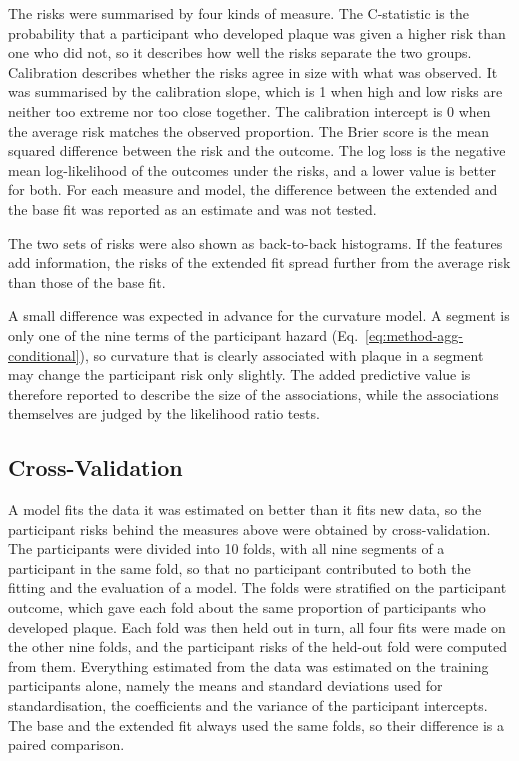 The risks were summarised by four kinds of measure.
The C-statistic is the probability that a participant who developed plaque was given a higher risk than one who did not, so it describes how well the risks separate the two groups.
Calibration describes whether the risks agree in size with what was observed.
It was summarised by the calibration slope, which is 1 when high and low risks are neither too extreme nor too close together.
The calibration intercept is 0 when the average risk matches the observed proportion.
The Brier score is the mean squared difference between the risk and the outcome.
The log loss is the negative mean log-likelihood of the outcomes under the risks, and a lower value is better for both.
For each measure and model, the difference between the extended and the base fit was reported as an estimate and was not tested.

The two sets of risks were also shown as back-to-back histograms.
If the features add information, the risks of the extended fit spread further from the average risk than those of the base fit.

A small difference was expected in advance for the curvature model.
A segment is only one of the nine terms of the participant hazard (Eq.~\eqref{eq:method-agg-conditional}), so curvature that is clearly associated with plaque in a segment may change the participant risk only slightly.
The added predictive value is therefore reported to describe the size of the associations, while the associations themselves are judged by the likelihood ratio tests.

\subsection{Cross-Validation}
\label{sec:method-cv}

A model fits the data it was estimated on better than it fits new data, so the participant risks behind the measures above were obtained by cross-validation.
The participants were divided into 10 folds, with all nine segments of a participant in the same fold, so that no participant contributed to both the fitting and the evaluation of a model.
The folds were stratified on the participant outcome, which gave each fold about the same proportion of participants who developed plaque.
Each fold was then held out in turn, all four fits were made on the other nine folds, and the participant risks of the held-out fold were computed from them.
Everything estimated from the data was estimated on the training participants alone, namely the means and standard deviations used for standardisation, the coefficients and the variance of the participant intercepts.
The base and the extended fit always used the same folds, so their difference is a paired comparison.

